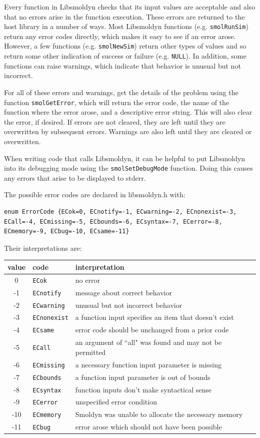 \documentclass {book}
\newcommand {\ttt} {\texttt}
\begin{document}
Every function in Libsmoldyn checks that its input values are acceptable and also that no errors arise in the function execution. These errors are returned to the host library in a number of ways. Most Libsmoldyn functions (e.g. \ttt{smolRunSim}) return any error codes directly, which makes it easy to see if an error arose. However, a few functions (e.g. \ttt{smolNewSim}) return other types of values and so return some other indication of success or failure (e.g. \ttt{NULL}). In addition, some functions can raise warnings, which indicate that behavior is unusual but not incorrect.

For all of these errors and warnings, get the details of the problem using the function \ttt{smolGetError}, which will return the error code, the name of the function where the error arose, and a descriptive error string. This will also clear the error, if desired. If errors are not cleared, they are left until they are overwritten by subsequent errors. Warnings are also left until they are cleared or overwritten.

When writing code that calls Libsmoldyn, it can be helpful to put Libsmoldyn into its debugging mode using the \ttt{smolSetDebugMode} function. Doing this causes any errors that arise to be displayed to stderr.

The possible error codes are declared in libsmoldyn.h with:

\begin{lstlisting}[style=SSAC]
enum ErrorCode {ECok=0, ECnotify=-1, ECwarning=-2, ECnonexist=-3, ECall=-4, ECmissing=-5, ECbounds=-6, ECsyntax=-7, ECerror=-8, ECmemory=-9, ECbug=-10, ECsame=-11}
\end{lstlisting}

Their interpretations are:

\begin{longtable}[c]{cll}
value & code & interpretation\\
\hline
0 & \ttt{ECok} & no error\\
-1 & \ttt{ECnotify} & message about correct behavior\\
-2 & \ttt{ECwarning} & unusual but not incorrect behavior\\
-3 & \ttt{ECnonexist} & a function input specifies an item that doesn't exist\\
-4 & \ttt{ECsame} & error code should be unchanged from a prior code\\
-5 & \ttt{ECall} & an argument of ``all" was found and may not be permitted\\
-6 & \ttt{ECmissing} & a necessary function input parameter is missing\\
-7 & \ttt{ECbounds} & a function input parameter is out of bounds\\
-8 & \ttt{ECsyntax} & function inputs don't make syntactical sense\\
-9 & \ttt{ECerror} & unspecified error condition\\
-10 & \ttt{ECmemory} & Smoldyn was unable to allocate the necessary memory\\
-11 & \ttt{ECbug} & error arose which should not have been possible\\

\end{longtable}
\end{document}
